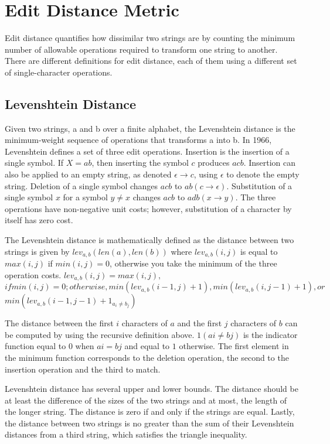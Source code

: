 \section{Edit Distance Metric}
Edit distance quantifies how dissimilar two strings are by counting the minimum number of allowable operations required to transform one string to another. There are different definitions for edit distance, each of them using a different set of single-character operations.

\subsection{Levenshtein Distance}
Given two strings, a and b over a finite alphabet, the Levenshtein distance is the minimum-weight sequence of operations that transforms a into b. In 1966, Levenshtein defines a set of three edit operations. Insertion is the insertion of a single symbol. If $X=ab$, then inserting the symbol $c$ produces $acb$. Insertion can also be applied to an empty string, as denoted $\epsilon \rightarrow c$, using $\epsilon$ to denote the empty string. Deletion of a single symbol changes $acb$ to $ab (c \rightarrow \epsilon)$. Substitution of a single symbol $x$ for a symbol $y \neq x$ changes $acb$ to $adb (x \rightarrow y)$. The three operations have non-negative unit costs; however, substitution of a character by itself has zero cost.

The Levenshtein distance is mathematically defined as the distance between two strings is given by $lev_{a,b}(len(a),len(b))$ where $lev_{a,b}(i,j)$ is equal to $max(i,j)$ if $min(i,j) = 0$, otherwise you take the minimum of the three operation costs. $lev_{a,b}(i,j) = max(i,j),$	  $if min(i,j) = 0; otherwise, min(lev_{a,b}(i-1,j)+1), min(lev_{a,b}(i,j-1)+1), or$   $ min(lev_{a,b}(i-1,j-1)+1_{a_i\neq b_j})$

The distance between the first $i$ characters of $a$ and the first $j$ characters of $b$ can be computed by using the recursive definition above. $1(ai \neq bj)$ is the indicator function equal to $0$ when $ai = bj$ and equal to $1$ otherwise. The first element in the minimum function corresponds to the deletion operation, the second to the insertion operation and the third to match.

Levenshtein distance has several upper and lower bounds. The distance should be at least the difference of the sizes of the two strings and at most, the length of the longer string. The distance is zero if and only if the strings are equal. Lastly, the distance between two strings is no greater than the sum of their Levenshtein distances from a third string, which satisfies the triangle inequality.

